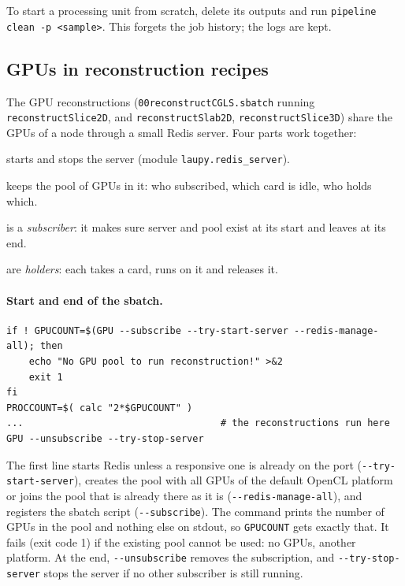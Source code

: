 \documentclass[11pt,a4paper]{article}
\newcommand{\cmd}[1]{\texttt{#1}}
\begin{document}
To start a processing unit from scratch, delete its outputs and run
\cmd{pipeline clean -p <sample>}. This forgets the job history; the logs are kept.

\subsection{GPUs in reconstruction recipes}\label{sec:gpuworkflow}

The GPU reconstructions (\cmd{00reconstructCGLS.sbatch} running \cmd{reconstructSlice2D}, and
\cmd{reconstructSlab2D}, \cmd{reconstructSlice3D}) share the GPUs of a node through a small Redis
server. Four parts work together:
\begin{description}[style=nextline,leftmargin=1.5em,itemsep=2pt]
  \item[\cmd{REDIS}] starts and stops the server (module \cmd{laupy.redis\_server}).
  \item[\cmd{GPU}] keeps the pool of GPUs in it: who subscribed, which card is idle, who holds which.
  \item[The sbatch script] is a \emph{subscriber}: it makes sure server and pool exist at its start
    and leaves at its end.
  \item[The reconstruction scripts] are \emph{holders}: each takes a card, runs on it and releases it.
\end{description}

\paragraph{Start and end of the sbatch.}
\begin{lstlisting}
if ! GPUCOUNT=$(GPU --subscribe --try-start-server --redis-manage-all); then
	echo "No GPU pool to run reconstruction!" >&2
	exit 1
fi
PROCCOUNT=$( calc "2*$GPUCOUNT" )
...                                   # the reconstructions run here
GPU --unsubscribe --try-stop-server
\end{lstlisting}
The first line starts Redis unless a responsive one is already on the port
(\cmd{-{}-try-start-server}), creates the pool with all GPUs of the default OpenCL platform or joins
the pool that is already there as it is (\cmd{-{}-redis-manage-all}), and registers the sbatch script
(\cmd{-{}-subscribe}). The command
prints the number of GPUs in the pool and nothing else on stdout, so \cmd{GPUCOUNT} gets exactly
that. It fails (exit code 1) if the existing pool cannot be used: no GPUs, another platform. At the
end, \cmd{-{}-unsubscribe} removes the subscription, and \cmd{-{}-try-stop-server} stops the server
if no other subscriber is still running.
\end{document}
